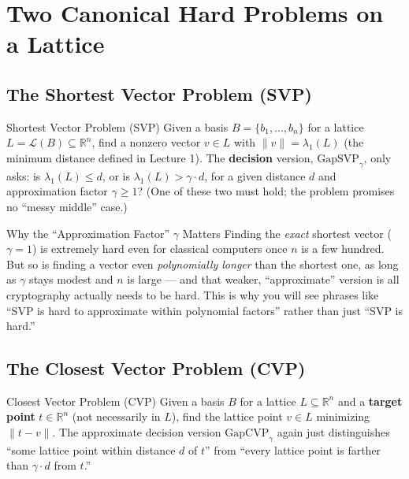 \section{Two Canonical Hard Problems on a Lattice}
\label{sec:L2:two-canonical-hard-problems-on-a-lattice}

\subsection{The Shortest Vector Problem (SVP)}
\label{sec:L2:the-shortest-vector-problem-svp}

\begin{defbox}{Shortest Vector Problem (SVP)}
Given a basis $B = \{b_1,\ldots,b_n\}$ for a lattice $L = \mathcal{L}(B) \subseteq \mathbb{R}^n$, find a nonzero vector $v \in L$ with $\|v\| = \lambda_1(L)$ (the minimum distance defined in Lecture 1). The \textbf{decision} version, $\text{GapSVP}_\gamma$, only asks: is $\lambda_1(L) \le d$, or is $\lambda_1(L) > \gamma \cdot d$, for a given distance $d$ and approximation factor $\gamma \ge 1$? (One of these two must hold; the problem promises no ``messy middle'' case.)
\end{defbox}

\begin{rmkbox}{Why the ``Approximation Factor'' $\gamma$ Matters}
Finding the \emph{exact} shortest vector ($\gamma = 1$) is extremely hard even for classical computers once $n$ is a few hundred. But so is finding a vector even \emph{polynomially longer} than the shortest one, as long as $\gamma$ stays modest and $n$ is large --- and that weaker, ``approximate'' version is all cryptography actually needs to be hard. This is why you will see phrases like ``SVP is hard to approximate within polynomial factors'' rather than just ``SVP is hard.''
\end{rmkbox}

\subsection{The Closest Vector Problem (CVP)}
\label{sec:L2:the-closest-vector-problem-cvp}

\begin{defbox}{Closest Vector Problem (CVP)}
Given a basis $B$ for a lattice $L \subseteq \mathbb{R}^n$ and a \textbf{target point} $t \in \mathbb{R}^n$ (not necessarily in $L$), find the lattice point $v \in L$ minimizing $\|t - v\|$. The approximate decision version $\text{GapCVP}_\gamma$ again just distinguishes ``some lattice point within distance $d$ of $t$'' from ``every lattice point is farther than $\gamma \cdot d$ from $t$.''
\end{defbox}

